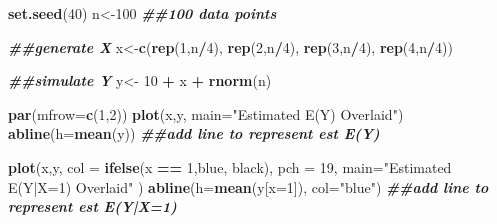 \documentclass[
]{book}
\newenvironment{Shaded}{\begin{snugshade}}{\end{snugshade}}
\newcommand{\AttributeTok}[1]{\textcolor[rgb]{0.13,0.29,0.53}{#1}}
\newcommand{\DecValTok}[1]{\textcolor[rgb]{0.00,0.00,0.81}{#1}}
\newcommand{\DocumentationTok}[1]{\textcolor[rgb]{0.56,0.35,0.01}{\textbf{\textit{#1}}}}
\newcommand{\FunctionTok}[1]{\textcolor[rgb]{0.13,0.29,0.53}{\textbf{#1}}}
\newcommand{\NormalTok}[1]{#1}
\newcommand{\OtherTok}[1]{\textcolor[rgb]{0.56,0.35,0.01}{#1}}
\newcommand{\SpecialCharTok}[1]{\textcolor[rgb]{0.81,0.36,0.00}{\textbf{#1}}}
\newcommand{\StringTok}[1]{\textcolor[rgb]{0.31,0.60,0.02}{#1}}
\begin{document}
\begin{Shaded}
\begin{Highlighting}[]
\FunctionTok{set.seed}\NormalTok{(}\DecValTok{40}\NormalTok{)}
\NormalTok{n}\OtherTok{\textless{}{-}}\DecValTok{100} \DocumentationTok{\#\#100 data points}

\DocumentationTok{\#\#generate X}
\NormalTok{x}\OtherTok{\textless{}{-}}\FunctionTok{c}\NormalTok{(}\FunctionTok{rep}\NormalTok{(}\DecValTok{1}\NormalTok{,n}\SpecialCharTok{/}\DecValTok{4}\NormalTok{), }\FunctionTok{rep}\NormalTok{(}\DecValTok{2}\NormalTok{,n}\SpecialCharTok{/}\DecValTok{4}\NormalTok{), }\FunctionTok{rep}\NormalTok{(}\DecValTok{3}\NormalTok{,n}\SpecialCharTok{/}\DecValTok{4}\NormalTok{), }\FunctionTok{rep}\NormalTok{(}\DecValTok{4}\NormalTok{,n}\SpecialCharTok{/}\DecValTok{4}\NormalTok{)) }

\DocumentationTok{\#\#simulate Y}
\NormalTok{y}\OtherTok{\textless{}{-}} \DecValTok{10} \SpecialCharTok{+}\NormalTok{ x }\SpecialCharTok{+} \FunctionTok{rnorm}\NormalTok{(n)}

\FunctionTok{par}\NormalTok{(}\AttributeTok{mfrow=}\FunctionTok{c}\NormalTok{(}\DecValTok{1}\NormalTok{,}\DecValTok{2}\NormalTok{))}
\FunctionTok{plot}\NormalTok{(x,y, }\AttributeTok{main=}\StringTok{"Estimated E(Y) Overlaid"}\NormalTok{)}
\FunctionTok{abline}\NormalTok{(}\AttributeTok{h=}\FunctionTok{mean}\NormalTok{(y)) }\DocumentationTok{\#\#add line to represent est E(Y)}

\FunctionTok{plot}\NormalTok{(x,y, }\AttributeTok{col =} \FunctionTok{ifelse}\NormalTok{(x }\SpecialCharTok{==} \DecValTok{1}\NormalTok{,}\StringTok{\textquotesingle{}blue\textquotesingle{}}\NormalTok{, }\StringTok{\textquotesingle{}black\textquotesingle{}}\NormalTok{), }\AttributeTok{pch =} \DecValTok{19}\NormalTok{, }\AttributeTok{main=}\StringTok{"Estimated E(Y|X=1) Overlaid"}\NormalTok{ )}
\FunctionTok{abline}\NormalTok{(}\AttributeTok{h=}\FunctionTok{mean}\NormalTok{(y[}\AttributeTok{x=}\DecValTok{1}\NormalTok{]), }\AttributeTok{col=}\StringTok{"blue"}\NormalTok{) }\DocumentationTok{\#\#add line to represent est E(Y|X=1)}
\end{Highlighting}
\end{Shaded}
\end{document}
